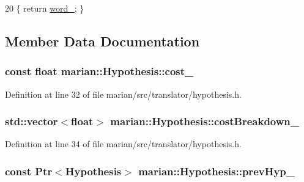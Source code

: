 \begin{DoxyCode}
20 \{ \textcolor{keywordflow}{return} \hyperlink{classmarian_1_1Hypothesis_af6a592017f00d65952995901371c6ebf}{word\_}; \}
\end{DoxyCode}


\subsection{Member Data Documentation}
\subsubsection[{\texorpdfstring{cost\+\_\+}{cost_}}]{\setlength{\rightskip}{0pt plus 5cm}const float marian\+::\+Hypothesis\+::cost\+\_\+\hspace{0.3cm}{\ttfamily [private]}}\hypertarget{classmarian_1_1Hypothesis_ab1226b0488b36816a3596988a19483c6}{}\label{classmarian_1_1Hypothesis_ab1226b0488b36816a3596988a19483c6}


Definition at line 32 of file marian/src/translator/hypothesis.\+h.

\subsubsection[{\texorpdfstring{cost\+Breakdown\+\_\+}{costBreakdown_}}]{\setlength{\rightskip}{0pt plus 5cm}std\+::vector$<$float$>$ marian\+::\+Hypothesis\+::cost\+Breakdown\+\_\+\hspace{0.3cm}{\ttfamily [private]}}\hypertarget{classmarian_1_1Hypothesis_acd703ab8971154a3e1499d68bac4aa22}{}\label{classmarian_1_1Hypothesis_acd703ab8971154a3e1499d68bac4aa22}


Definition at line 34 of file marian/src/translator/hypothesis.\+h.

\subsubsection[{\texorpdfstring{prev\+Hyp\+\_\+}{prevHyp_}}]{\setlength{\rightskip}{0pt plus 5cm}const {\bf Ptr}$<${\bf Hypothesis}$>$ marian\+::\+Hypothesis\+::prev\+Hyp\+\_\+\hspace{0.3cm}{\ttfamily [private]}}\hypertarget{classmarian_1_1Hypothesis_a8fa72ed72506549b2b089437c075a44b}{}\label{classmarian_1_1Hypothesis_a8fa72ed72506549b2b089437c075a44b}


